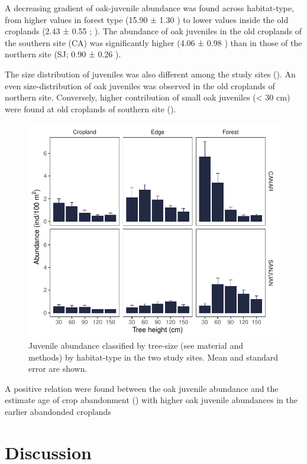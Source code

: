 A decreasing gradient of oak-juvenile abundance was found across habitat-type, from higher values in forest type (15.90 ± 1.30 \juv) to lower values inside the old croplands (2.43 ± 0.55 \juv; ). The abundance of oak juveniles in the old croplands of the southern site (CA) was significantly higher (4.06 ± 0.98 \juv) than in those of the northern site (SJ; 0.90 ± 0.26 \juv). 

The size distribution of juveniles was also different among the study sites (). An even size-distribution of oak juveniles was observed in the old croplands of northern site. Conversely, higher contribution of small oak juveniles (< 30 cm) were found at old croplands of southern site (). 

\begin{figure}
    \centering
    \includegraphics[width=\textwidth]{img/coloniza/coloniza-TreeCategory.pdf}
    \caption{Juvenile abundance classified by tree-size (see material and methods) by habitat-type in the two study sites. Mean and standard error are shown.}
    \label{fig:coloniza:treeCategory}
\end{figure}


A positive relation were found between the oak juvenile abundance and the estimate age of crop abandonment () with higher oak juvenile abundances in the earlier abandonded croplands 

\section{Discussion}\label{sec:coloniza:disussion}


